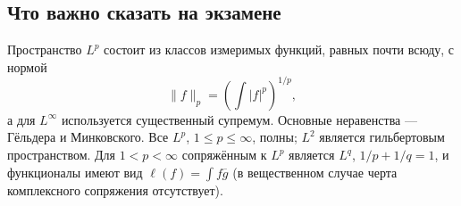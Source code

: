 \subsection{Что важно сказать на экзамене}

Пространство $L^p$ состоит из классов измеримых функций, равных почти всюду,
с нормой
\[
    \|f\|_p=\left(\int|f|^p\right)^{1/p},
\]
а для $L^\infty$ используется существенный супремум. Основные неравенства ---
Гёльдера и Минковского. Все $L^p$, $1\leq p\leq\infty$, полны; $L^2$ является
гильбертовым пространством. Для $1<p<\infty$ сопряжённым к $L^p$ является
$L^q$, $1/p+1/q=1$, и функционалы имеют вид
$\ell(f)=\int f\overline g$ (в вещественном случае черта комплексного сопряжения отсутствует).

\newpage
